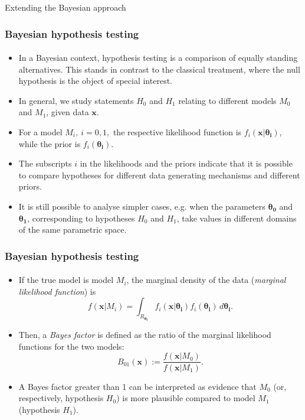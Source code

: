 \documentclass[10pt]{beamer}
\theoremstyle{definition}
\begin{document}
\begin{section}{Extending the Bayesian approach}
\begin{frame}[fragile]
\frametitle{Bayesian hypothesis testing}
\framesubtitle{}
\begin{itemize}\itemsep1em
\item In a Bayesian context, hypothesis testing is a comparison of equally standing alternatives. This stands in contrast to the classical treatment, where the null hypothesis is the object of special interest.
\item In general, we study statements $H_0$ and $H_1$ relating to different models $M_0$ and $M_1$, given data $\mathbf{x}$. 
\item For a model $M_i,~i=0,1,$ the respective likelihood function is $f_i(\mathbf{x}|\boldsymbol{\theta_i})$, while the prior is $f_i(\boldsymbol{\theta_i})$.
\item The subscripts $i$ in the likelihoods and the priors indicate that it is possible to compare hypotheses for different data generating mechanisms and different priors.
\item It is still possible to analyse simpler cases, e.g. when the parameters $\boldsymbol{\theta_0}$ and $\boldsymbol{\theta_1}$, corresponding to hypotheses $H_0$ and $H_1$, take values in different domains of the same parametric space. 
\end{itemize}
\end{frame}

\begin{frame}[fragile]
\frametitle{Bayesian hypothesis testing}
\framesubtitle{}
\begin{itemize}\itemsep1em
\item If the true model is model $M_i$, the marginal density of the data (\emph{marginal likelihood function}) is 
\begin{equation}
\label{eq:MargLik}
f(\mathbf{x}|M_i)=\int_{R_{\boldsymbol{\theta_i}}}f_i(\mathbf{x}|\boldsymbol{\theta_i})f_i(\boldsymbol{\theta_i})\,d\boldsymbol{\theta_i}.
\end{equation}
\item Then, a \emph{Bayes factor} is defined as the ratio of the marginal likelihood functions for the two models:
\begin{equation}
\label{eq:BayesFactor}B_{01}(\mathbf{x}):=\frac{f(\mathbf{x}|M_0)}{f(\mathbf{x}|M_1)}.
\end{equation}
\item A Bayes factor greater than 1 can be interpreted as evidence that $M_0$ (or, respectively, hypothesis $H_0$) is more plausible compared to model $M_1$ (hypothesis $H_1$).
\end{itemize}
\end{frame}


\end{section}
\end{document}
